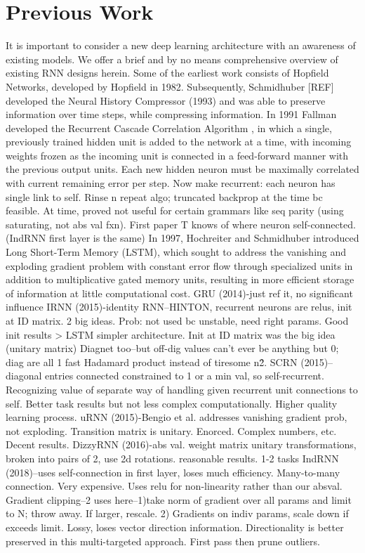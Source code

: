 \documentclass{article}
\begin{document}
\section{Previous Work}
\label{gen_inst}
It is important to consider a new deep learning architecture with an awareness of existing models.  We offer a brief and by no means comprehensive overview of existing RNN designs herein.  
Some of the earliest work consists of Hopfield Networks, developed by Hopfield in 1982.  Subsequently, Schmidhuber [REF] developed the Neural History Compressor (1993) and was able to preserve information over time steps, while compressing information.  In 1991 Fallman developed the Recurrent Cascade Correlation Algorithm \citet{Fahlman1990TheRC}, in which a single, previously trained hidden unit is added to the network at a time, with incoming weights frozen as the incoming unit is connected in a feed-forward manner with the previous output units. Each new hidden neuron must be maximally correlated with current remaining error per step.  Now make recurrent: each neuron has single link to self.  Rinse n repeat algo; truncated backprop at the time bc feasible.  At time, proved not useful for certain grammars like seq parity (using saturating, not abs val fxn). First paper T knows of where neuron self-connected. (IndRNN first layer is the same)
In 1997, Hochreiter and Schmidhuber introduced Long Short-Term Memory (LSTM), which sought to address the vanishing and exploding gradient problem with constant error flow through specialized units in addition to multiplicative gated memory units, resulting in more efficient storage of information at little computational cost.  
GRU (2014)-just ref it, no significant influence
IRNN (2015)-identity RNN--HINTON, recurrent neurons are relus, init at ID matrix. 2 big ideas. Prob: not used bc unstable, need right params.  Good init results > LSTM simpler architecture. Init at ID matrix was the big idea (unitary matrix) Diagnet too--but off-dig values can't ever be anything but 0; diag are all 1 fast Hadamard product instead of tiresome n\^2.
SCRN (2015)--diagonal entries connected constrained to 1 or a min val, so self-recurrent.  Recognizing value of separate way of handling given recurrent unit connections to self.  Better task results but not less complex computationally. Higher quality learning process.
uRNN (2015)-Bengio et al.  addresses vanishing gradient prob, not exploding.  Transition matrix is unitary.  Enorced.  Complex numbers, etc. Decent results.
DizzyRNN (2016)-abs val. weight matrix unitary transformations, broken into pairs of 2, use 2d rotations. reasonable results. 1-2 tasks 
IndRNN  (2018)--uses self-connection in first layer, loses much efficiency.  Many-to-many connection. Very expensive.  Uses relu for non-linearity rather than our absval.  
Gradient clipping--2 uses here--1)take norm of gradient over all params and limit to N; throw away.  If larger, rescale.  2) Gradients on indiv params, scale down if exceeds limit.  Lossy, loses vector direction information. Directionality is better preserved in this multi-targeted approach. First pass then prune outliers.    
\end{document}
